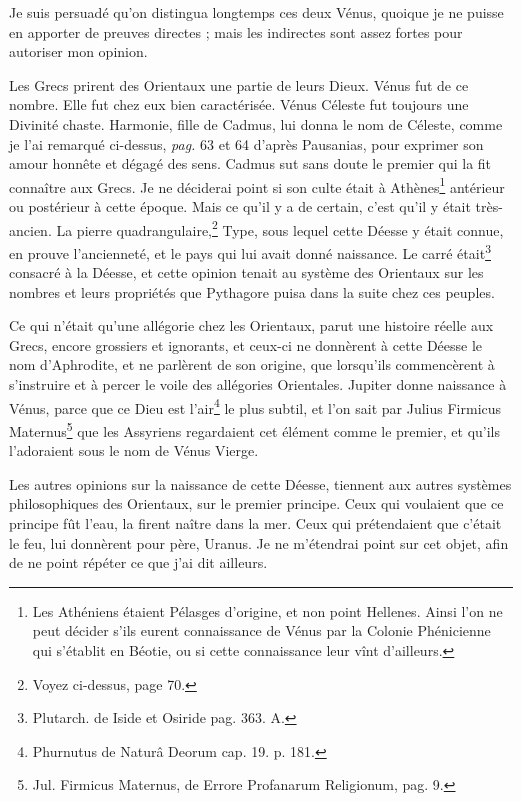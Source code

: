\documentclass[a4paper, 18pt, oneside]{article}
\begin{document}
Je suis persuadé qu'on distingua longtemps ces deux Vénus, quoique je ne puisse en apporter de preuves directes ; mais les indirectes sont assez fortes pour autoriser mon opinion.

Les Grecs prirent des Orientaux une partie de leurs Dieux. Vénus fut de ce nombre. Elle fut chez eux bien caractérisée. Vénus Céleste fut toujours une Divinité chaste. Harmonie, fille de Cadmus, lui donna le nom de Céleste, comme je l'ai remarqué ci-dessus, \emph{pag.} 63 et 64 d'après Pausanias, pour exprimer son amour honnête et dégagé des sens. Cadmus sut sans doute le premier qui la fit connaître aux Grecs. Je ne déciderai point si son culte était à Athènes\footnote{Les Athéniens étaient Pélasges d'origine, et non point Hellenes. Ainsi l'on ne peut décider s'ils eurent connaissance de Vénus par la Colonie Phénicienne qui s'établit en Béotie, ou si cette connaissance leur vînt d'ailleurs.} antérieur ou postérieur à cette époque. Mais ce qu'il y a de certain, c'est qu'il y était très-ancien. La pierre quadrangulaire,\footnote{Voyez ci-dessus, page 70.} Type, sous lequel cette Déesse y était connue, en prouve l'ancienneté, et le pays qui lui avait donné naissance. Le carré était\footnote{Plutarch. de Iside et Osiride pag. 363. A.} consacré à la Déesse, et cette opinion tenait au système des Orientaux sur les nombres et leurs propriétés que Pythagore puisa dans la suite chez ces peuples.

Ce qui n'était qu'une allégorie chez les Orientaux, parut une histoire réelle aux Grecs, encore grossiers et ignorants, et ceux-ci ne donnèrent à cette Déesse le nom d'Aphrodite, et ne parlèrent de son origine, que lorsqu'ils commencèrent à s'instruire et à percer le voile des allégories Orientales. Jupiter donne naissance à Vénus, parce que ce Dieu est l'air\footnote{Phurnutus de Naturâ Deorum cap. 19. p. 181.} le plus subtil, et l'on sait par Julius Firmicus Maternus\footnote{Jul. Firmicus Maternus, de Errore Profanarum Religionum, pag. 9.} que les Assyriens regardaient cet élément comme le premier, et qu'ils l'adoraient sous le nom de Vénus Vierge.

Les autres opinions sur la naissance de cette Déesse, tiennent aux autres systèmes philosophiques des Orientaux, sur le premier principe. Ceux qui voulaient que ce principe fût l'eau, la firent naître dans la mer. Ceux qui prétendaient que c'était le feu, lui donnèrent pour père, Uranus. Je ne m'étendrai point sur cet objet, afin de ne point répéter ce que j'ai dit ailleurs.
\end{document}
